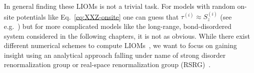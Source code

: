 In general finding these LIOMs is not a trivial task. For models with random on-site potentials like Eq.~\ref{eq:XXZ-onsite} one can guess that $\tau^{(i)}\approx S_z^{(i)}$ (see e.g.~\cite{adamiStructuralPropertiesLocal2022}) but for more complicated models like the long-range, bond-disordered system considered in the following chapters, it is not as obvious. While there exist different numerical schemes to compute LIOMs~\cite{chandranConstructingLocalIntegrals2015,mierzejewskiIdentifyingLocalQuasilocal2015,mierzejewskiApproximateConservationLaws2015,thomsonLocalIntegralsMotion2021,adamiStructuralPropertiesLocal2022}, we want to focus on gaining insight using an analytical approach falling under name of strong disorder renormalization group or real-space renormalization group (RSRG)~\cite{dasguptaLowtemperaturePropertiesRandom1980,fisherRandomAntiferromagneticQuantum1994,igloiStrongDisorderRG2005,voskManybodyLocalizationOne2013,voskTheoryManyBodyLocalization2015,igloiStrongDisorderRG2018}.


%


